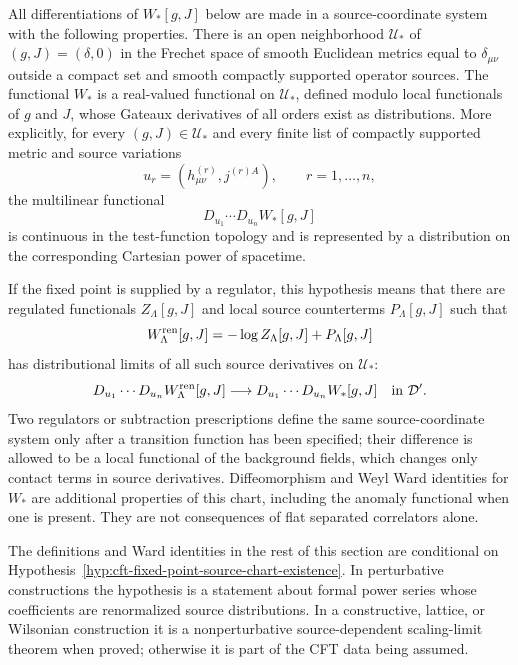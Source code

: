 \begin{hypothesis}
\label{hyp:cft-fixed-point-source-chart-existence}
All differentiations of \(W_\ast[g,J]\) below are made in a source-coordinate system with
the following properties.  There is an open neighborhood \(\mathcal U_\ast\)
of \((g,J)=(\delta,0)\) in the Frechet space of smooth Euclidean metrics equal
to \(\delta_{\mu\nu}\) outside a compact set and smooth compactly supported
operator sources.  The functional \(W_\ast\) is a real-valued functional on
\(\mathcal U_\ast\), defined modulo local functionals of \(g\) and \(J\), whose
Gateaux derivatives of all orders exist as distributions.  More explicitly,
for every \((g,J)\in\mathcal U_\ast\) and every finite list of compactly
supported metric and source variations
\[
  u_r=(h^{(r)}_{\mu\nu},j^{(r)A}),\qquad r=1,\ldots,n,
\]
the multilinear functional
\[
  D_{u_1}\cdots D_{u_n} W_\ast[g,J]
\]
is continuous in the test-function topology and is represented by a
distribution on the corresponding Cartesian power of spacetime.

If the fixed point is supplied by a regulator, this hypothesis means that
there are regulated functionals \(Z_{\Lambda}[g,J]\) and local source
counterterms \(P_{\Lambda}[g,J]\) such that
\[
  W_{\Lambda}^{\rm ren}[g,J]
  =
  -\log Z_{\Lambda}[g,J]+P_{\Lambda}[g,J]
\]
has distributional limits of all such source derivatives on
\(\mathcal U_\ast\):
\[
  D_{u_1}\cdots D_{u_n}W_{\Lambda}^{\rm ren}[g,J]
  \longrightarrow
  D_{u_1}\cdots D_{u_n}W_\ast[g,J]
  \quad\hbox{in }\mathcal D' .
\]
Two regulators or subtraction prescriptions define the same source-coordinate system only
after a transition function has been specified; their difference is allowed to
be a local functional of the background fields, which changes only contact
terms in source derivatives.  Diffeomorphism and Weyl Ward identities for
\(W_\ast\) are additional properties of this chart, including the anomaly
functional when one is present.  They are not consequences of flat separated
correlators alone.
\end{hypothesis}

The definitions and Ward identities in the rest of this section are conditional
on Hypothesis~\ref{hyp:cft-fixed-point-source-chart-existence}.  In
perturbative constructions the hypothesis is a statement about formal power
series whose coefficients are renormalized source distributions.  In a
constructive, lattice, or Wilsonian construction it is a nonperturbative
source-dependent scaling-limit theorem when proved; otherwise it is part of
the CFT data being assumed.

